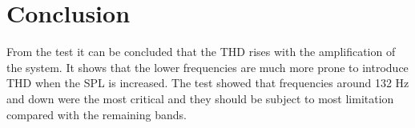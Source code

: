\section{Conclusion}

From the test it can be concluded that the THD rises with the amplification of the system. It shows that the lower frequencies are much more prone to introduce THD when the SPL is increased. The test showed that frequencies around 132 Hz and down were the most critical and they should be subject to most limitation compared with the remaining bands.

